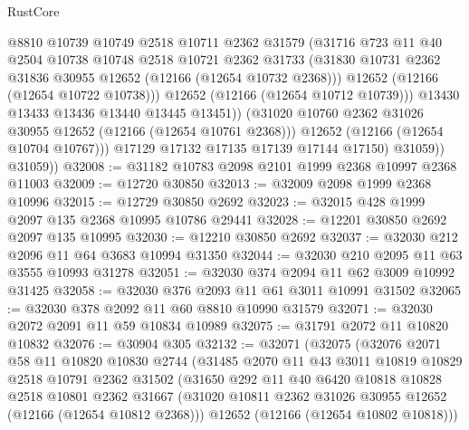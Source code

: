 \begin{lexlean}{RustCore}
\begin{coremodule}
                      @8810
                      @10739
                      @10749
                      @2518
                      @10711
                      @2362
                      @31579
                      (@31716
                        @723
                        @11
                        @40
                        @2504
                        @10738
                        @10748
                        @2518
                        @10721
                        @2362
                        @31733
                        (@31830 @10731 @2362 @31836 @30955 @12652 (@12166 (@12654 @10732 @2368)))
                        @12652
                        (@12166 (@12654 @10722 @10738)))
                      @12652
                      (@12166 (@12654 @10712 @10739)))
                    @13430
                    @13433
                    @13436
                    @13440
                    @13445
                    @13451))
                (@31020 @10760 @2362 @31026 @30955 @12652 (@12166 (@12654 @10761 @2368)))
                @12652
                (@12166 (@12654 @10704 @10767)))
              @17129
              @17132
              @17135
              @17139
              @17144
              @17150)
            @31059))
        @31059))
@32008 := @31182 @10783 @2098 @2101 @1999 @2368 @10997 @2368 @11003
@32009 := @12720 @30850
@32013 := @32009 @2098 @1999 @2368 @10996
@32015 := @12729 @30850 @2692
@32023 := @32015 @428 @1999 @2097 @135 @2368 @10995 @10786 @29441
@32028 := @12201 @30850 @2692 @2097 @135 @10995
@32030 := @12210 @30850 @2692
@32037 := @32030 @212 @2096 @11 @64 @3683 @10994 @31350
@32044 := @32030 @210 @2095 @11 @63 @3555 @10993 @31278
@32051 := @32030 @374 @2094 @11 @62 @3009 @10992 @31425
@32058 := @32030 @376 @2093 @11 @61 @3011 @10991 @31502
@32065 := @32030 @378 @2092 @11 @60 @8810 @10990 @31579
@32071 := @32030 @2072 @2091 @11 @59 @10834 @10989
@32075 := @31791 @2072 @11 @10820 @10832
@32076 := @30904 @305
@32132 := @32071
    (@32075
      (@32076
        @2071
        @58
        @11
        @10820
        @10830
        @2744
        (@31485
          @2070
          @11
          @43
          @3011
          @10819
          @10829
          @2518
          @10791
          @2362
          @31502
          (@31650
            @292
            @11
            @40
            @6420
            @10818
            @10828
            @2518
            @10801
            @2362
            @31667
            (@31020 @10811 @2362 @31026 @30955 @12652 (@12166 (@12654 @10812 @2368)))
            @12652
            (@12166 (@12654 @10802 @10818)))

\end{coremodule}
\end{lexlean}
